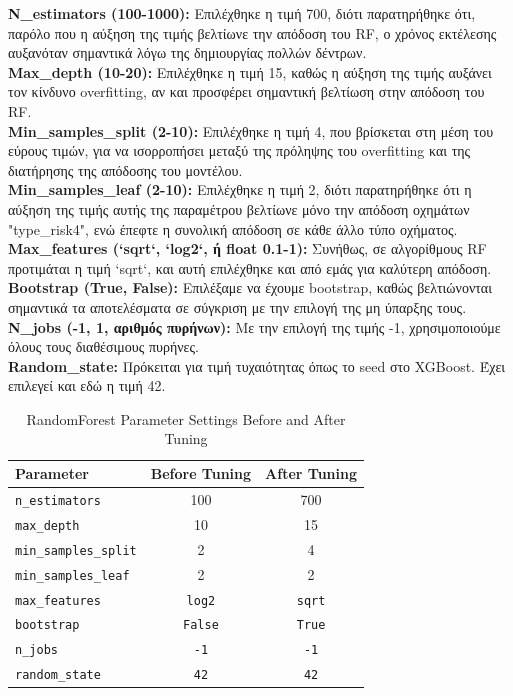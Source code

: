 \documentclass{llncs}
\begin{document}
\noindent \textbf{N\_estimators (100-1000):}
Επιλέχθηκε η τιμή 700, διότι παρατηρήθηκε ότι, παρόλο που η αύξηση της τιμής βελτίωνε την απόδοση του RF, ο χρόνος εκτέλεσης αυξανόταν σημαντικά λόγω της δημιουργίας πολλών δέντρων.\\

\noindent \textbf{Max\_depth (10-20):}
Επιλέχθηκε η τιμή 15, καθώς η αύξηση της τιμής αυξάνει τον κίνδυνο overfitting, αν και προσφέρει σημαντική βελτίωση στην απόδοση του RF. \\

\noindent \textbf{Min\_samples\_split (2-10):}
Επιλέχθηκε η τιμή 4, που βρίσκεται στη μέση του εύρους τιμών, για να ισορροπήσει μεταξύ της πρόληψης του overfitting και της διατήρησης της απόδοσης του μοντέλου.\\

\noindent \textbf{Min\_samples\_leaf (2-10):}
Επιλέχθηκε η τιμή 2, διότι παρατηρήθηκε ότι η αύξηση της τιμής αυτής της παραμέτρου βελτίωνε μόνο την απόδοση οχημάτων "type\_risk4", ενώ έπεφτε η συνολική απόδοση σε κάθε άλλο τύπο οχήματος. \\

\noindent \textbf{Max\_features (`sqrt`, `log2`, ή float 0.1-1):}
Συνήθως, σε αλγορίθμους RF προτιμάται η τιμή `sqrt`, και αυτή επιλέχθηκε και από εμάς για καλύτερη απόδοση. \\

\noindent \textbf{Bootstrap (True, False):}
Επιλέξαμε να έχουμε bootstrap, καθώς βελτιώνονται σημαντικά τα αποτελέσματα σε σύγκριση με την επιλογή της μη ύπαρξης τους.\\

\noindent \textbf{N\_jobs (-1, 1, αριθμός πυρήνων):}
Με την επιλογή της τιμής -1, χρησιμοποιούμε όλους τους διαθέσιμους πυρήνες.\\

\noindent \textbf{Random\_state:}
Πρόκειται για τιμή τυχαιότητας όπως το seed στο XGBoost. Έχει επιλεγεί και εδώ η τιμή 42.\\

\begin{table}[h!]
    \centering
    \begin{tabular}{l|cc}
        \hline
        Parameter & Before Tuning & After Tuning \\
        \hline
        \texttt{n\_estimators} & 100 & 700 \\
        \texttt{max\_depth} & 10 & 15 \\
        \texttt{min\_samples\_split} & 2 & 4 \\
        \texttt{min\_samples\_leaf} & 2 & 2 \\
        \texttt{max\_features} & \texttt{log2} & \texttt{sqrt} \\
        \texttt{bootstrap} & \texttt{False} & \texttt{True} \\
        \texttt{n\_jobs} & \texttt{-1} & \texttt{-1} \\
        \texttt{random\_state} & \texttt{42} & \texttt{42} \\
        \hline
    \end{tabular}
    \caption{RandomForest Parameter Settings Before and After Tuning}
\end{table}
\end{document}
